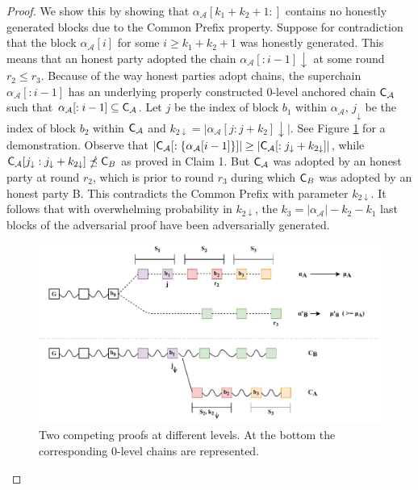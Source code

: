 \begin{proof}
	\noindent
	We show this by showing that $\alpha_\mathcal{A}[k_1 + k_2 + 1:]$ contains no honestly generated
	blocks due to the Common Prefix property. Suppose for contradiction that the block $\alpha_\mathcal{A}[i]$ for some $i \geq k_1 +
	k_2 + 1$ was honestly generated. This means that an honest party adopted the chain
	$\alpha_\mathcal{A}[:i - 1]\downarrow$ at some round $r_2 \leq r_3$. Because of the way honest
	parties adopt chains, the superchain $\alpha_\mathcal{A}[:i - 1]$ has an underlying properly
	constructed 0-level anchored chain $\mathsf{C}_\mathcal{A}$ such that $\alpha_\mathcal{A}[:i - 1] \subseteq \mathsf{C}_\mathcal{A}$.
	Let $j$ be the index of block $b_1$ within $\alpha_\mathcal{A}$, $j_\downarrow$ be the index
	of block $b_2$ within $\mathsf{C}_\mathcal{A}$ and $k_{2\downarrow} = \vert \alpha_\mathcal{A}[j:j+k_2]\downarrow\vert$.
	See Figure \ref{fig:proof} for a demonstration. Observe that $\vert \mathsf{C}_\mathcal{A}[:\{\alpha_\mathcal{A}[i-1]\}]
	\vert \geq \vert \mathsf{C}_\mathcal{A}[:{j_\downarrow}+k_{2\downarrow}] \vert$, while
	$\mathsf{C}_\mathcal{A}[j_\downarrow:j_\downarrow + k_{2\downarrow}] \npreceq \mathsf{C}_B$ as proved in
	Claim 1. But $\mathsf{C}_\mathcal{A}$ was adopted by an honest party at round $r_2$, which is prior
	to round $r_3$ during which $\mathsf{C}_B$ was adopted by an honest party B. This 
	contradicts the Common Prefix\cite{backbone} with parameter $k_{2\downarrow}$. It follows that with overwhelming probability in $k_{2\downarrow}$, the 
	$k_3 = \vert \alpha_\mathcal{A} \vert - k_2 - k_1$ last blocks of the adversarial proof have been adversarially generated.\\

	\begin{figure}[h]
		\begin{center}
			\includegraphics[width=\columnwidth]{figures/proof.pdf}
		\end{center}
		\caption{Two competing proofs at different levels. At the bottom the
		corresponding 0-level chains are represented.}
		\label{fig:proof}
	\end{figure}


\end{proof}
